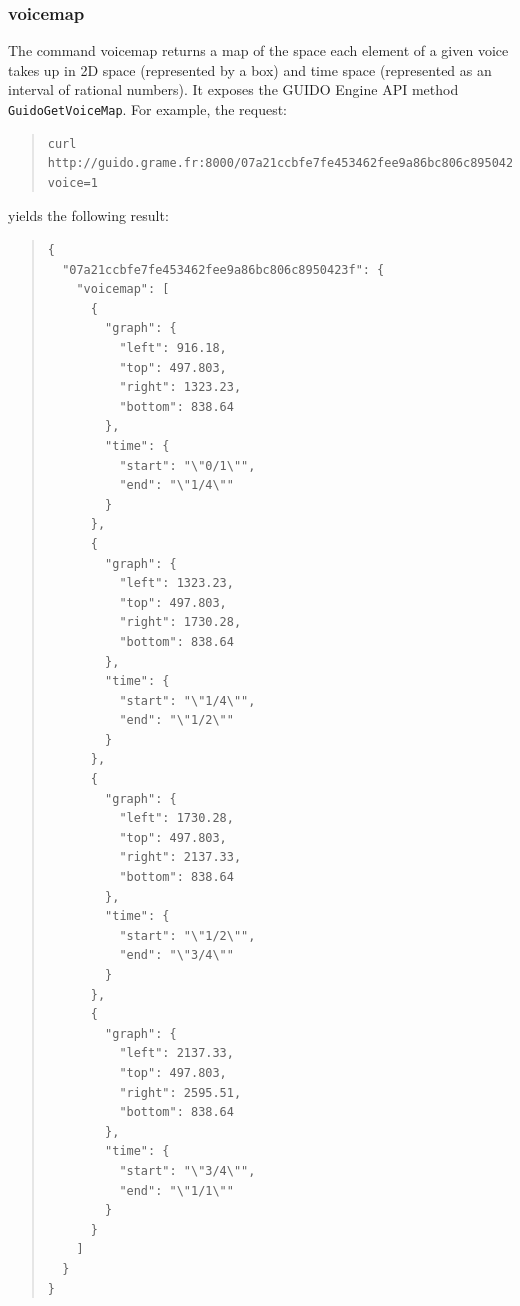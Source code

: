 \documentclass[a4paper]{article}
\begin{document}
\subsubsection{voicemap}
The command voicemap returns a map of the space each element of a given voice takes up in 2D space (represented by a box) and time space (represented as an interval of rational numbers).  It exposes the GUIDO Engine API method \verb=GuidoGetVoiceMap=.  For example, the request:
\begin{quote}
\begingroup
\fontsize{7.5pt}{12pt}\selectfont
\begin{verbatim}
curl http://guido.grame.fr:8000/07a21ccbfe7fe453462fee9a86bc806c8950423f/voicemap?voice=1
\end{verbatim}
\endgroup
\end{quote}
yields the following result:
\begin{quote}
\begin{verbatim}
{
  "07a21ccbfe7fe453462fee9a86bc806c8950423f": {
    "voicemap": [
      {
        "graph": {
          "left": 916.18,
          "top": 497.803,
          "right": 1323.23,
          "bottom": 838.64
        },
        "time": {
          "start": "\"0/1\"",
          "end": "\"1/4\""
        }
      },
      {
        "graph": {
          "left": 1323.23,
          "top": 497.803,
          "right": 1730.28,
          "bottom": 838.64
        },
        "time": {
          "start": "\"1/4\"",
          "end": "\"1/2\""
        }
      },
      {
        "graph": {
          "left": 1730.28,
          "top": 497.803,
          "right": 2137.33,
          "bottom": 838.64
        },
        "time": {
          "start": "\"1/2\"",
          "end": "\"3/4\""
        }
      },
      {
        "graph": {
          "left": 2137.33,
          "top": 497.803,
          "right": 2595.51,
          "bottom": 838.64
        },
        "time": {
          "start": "\"3/4\"",
          "end": "\"1/1\""
        }
      }
    ]
  }
}
\end{verbatim}
\end{quote}
\end{document}

